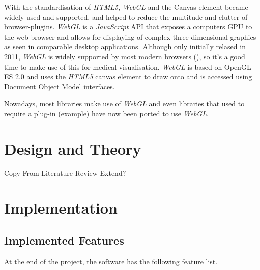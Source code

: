 \documentclass[a4paper,11pt,titlepage]{article}
\begin{document}
With the standardisation of \textit{HTML5}, \textit{WebGL} and the Canvas element became widely used and supported, and helped to reduce the multitude and clutter of browser-plugins. \textit{WebGL} is a \textit{JavaScript} API that exposes a computers GPU to the web browser and allows for displaying of complex three dimensional graphics as seen in comparable desktop applications. Although only initially relased in 2011, \textit{WebGL} is widely supported by most modern browsers (\cite{webGL}), so it's a good time to make use of this for medical visualisation. \textit{WebGL} is based on OpenGL ES 2.0 and uses the \textit{HTML5} canvas element to draw onto and is accessed using Document Object Model interfaces.

Nowadays, most libraries make use of \textit{WebGL} and even libraries that used to require a plug-in (example) have now been ported to use \textit{WebGL}. 











\section{Design and Theory}

Copy From Literature Review
Extend?


\section{Implementation}

\subsection{Implemented Features}

At the end of the project, the software has the following feature list.
\end{document}
